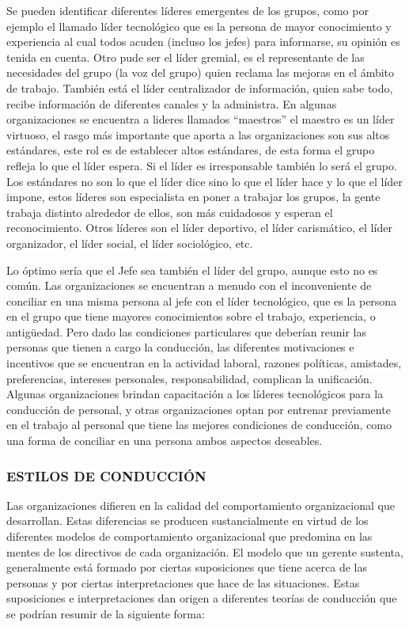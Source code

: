 Se pueden identificar diferentes líderes emergentes de los grupos, como por ejemplo el llamado líder tecnológico que es la persona de mayor conocimiento y experiencia al cual todos acuden (incluso los jefes) para informarse, su opinión es tenida en cuenta. Otro pude ser el líder gremial, es el representante de las necesidades del grupo (la voz del grupo) quien reclama las mejoras en el ámbito de trabajo. También está el líder centralizador de información, quien sabe todo, recibe información de diferentes canales y la administra. En algunas organizaciones se encuentra a lideres llamados “maestros” el maestro es un líder virtuoso, el rasgo más importante que aporta a las organizaciones son sus altos estándares, este rol es de establecer altos estándares, de esta forma el grupo refleja lo que el líder espera. Si el líder es irresponsable también lo será el grupo. Los estándares no son lo que el líder dice sino lo que el líder hace y lo que el líder impone, estos líderes son especialista en poner a trabajar los grupos, la gente trabaja distinto alrededor de ellos, son más cuidadosos y esperan el reconocimiento. Otros líderes son el líder deportivo, el líder carismático, el líder organizador, el líder social, el líder sociológico, etc.

Lo óptimo sería que el Jefe sea también el líder del grupo, aunque esto no es común. Las organizaciones se encuentran a menudo con el inconveniente de conciliar en una misma persona al jefe con el líder tecnológico, que es la persona en el grupo que tiene mayores conocimientos sobre el trabajo, experiencia, o antigüedad. Pero dado las condiciones particulares que deberían reunir las personas que tienen a cargo la conducción, las diferentes motivaciones e incentivos que se encuentran en la actividad laboral, razones políticas, amistades, preferencias, intereses personales, responsabilidad, complican la unificación. Algunas organizaciones brindan capacitación a los líderes tecnológicos para la conducción de personal, y otras organizaciones optan por entrenar previamente en el trabajo al personal que tiene las mejores condiciones de conducción, como una forma de conciliar en una persona ambos aspectos deseables.

\subsubsection*{ESTILOS DE CONDUCCIÓN}
Las organizaciones difieren en la calidad del comportamiento organizacional que desarrollan. Estas diferencias se producen sustancialmente en virtud de los diferentes modelos de comportamiento organizacional que predomina en las mentes de los directivos de cada organización. El modelo que un gerente sustenta, generalmente está formado por ciertas suposiciones que tiene acerca de las personas y por ciertas interpretaciones que hace de las situaciones. Estas suposiciones e interpretaciones dan origen a diferentes teorías de conducción que se podrían resumir de la siguiente forma:

